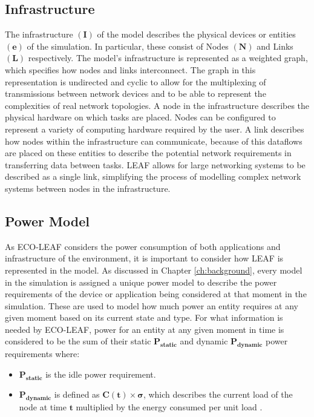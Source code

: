 \documentclass{l4proj}
\begin{document}
\subsection{Infrastructure}\label{subsec:infrastructure}
The infrastructure $\mathbf{(I)}$ of the model describes the physical devices or entities $\mathbf{(e)}$ of the simulation. In particular, these consist of Nodes $\mathbf{(N)}$ and Links $\mathbf{(L)}$ respectively.
The model's infrastructure is represented as a weighted graph, which specifies how nodes and links interconnect.
The graph in this representation is undirected and cyclic to allow for the multiplexing of transmissions between network devices and to be able to represent the complexities of real network topologies.
A node in the infrastructure describes the physical hardware on which tasks are placed. Nodes can be configured to represent a variety of computing hardware required by the user.
A link describes how nodes within the infrastructure can communicate, because of this dataflows are placed on these entities to describe the potential network requirements in transferring data between tasks.
LEAF allows for large networking systems to be described as a single link, simplifying the process of modelling complex network systems between nodes in the infrastructure.

\subsection{Power Model}\label{subsec:power-model}
As ECO-LEAF considers the power consumption of both applications and infrastructure of the environment, it is important to consider how LEAF is represented in the model.
As discussed in Chapter \ref{ch:background}, every model in the simulation is assigned a unique power model to describe the power requirements of the device or application being considered at that moment in the simulation.
These are used to model how much power an entity requires at any given moment based on its current state and type.
For what information is needed by ECO-LEAF, power for an entity at any given moment in time is considered to be the sum of their static $\mathbf{P_{static}}$ and dynamic $\mathbf{P_{dynamic}}$ power requirements where:
\begin{itemize}
    \item $\mathbf{P_{static}}$ is the idle power requirement.\\
    \item $\mathbf{P_{dynamic}}$ is defined as $\mathbf{C(t) \times \sigma}$, which describes the current load of the node at time $\mathbf{t}$ multiplied by the energy consumed per unit load \citep{leaf2021}.
\end{itemize}
\end{document}
